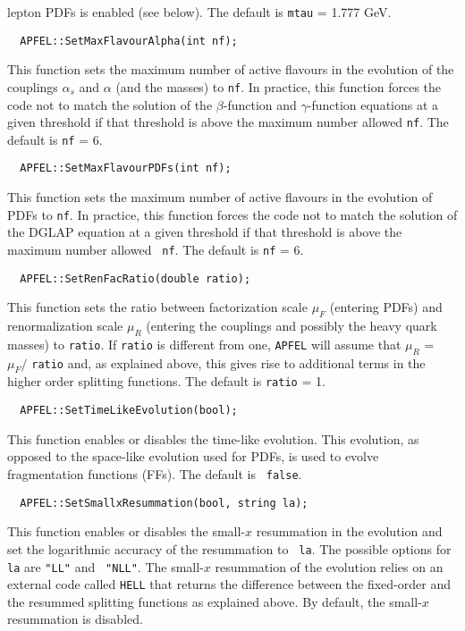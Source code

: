 \documentclass[11pt,a4paper]{article}
\begin{document}
lepton PDFs is enabled (see below). The default is {\tt mtau} =
1.777 GeV.
\begin{lstlisting}
  APFEL::SetMaxFlavourAlpha(int nf);
\end{lstlisting}
This function sets the maximum number of active flavours in the
evolution of the couplings $\alpha_s$ and $\alpha$ (and the masses) to
{\tt nf}. In practice, this function forces the code not to match the
solution of the $\beta$-function and $\gamma$-function equations at a
given threshold if that threshold is above the maximum number allowed
{\tt nf}. The default is {\tt nf} = 6.
\begin{lstlisting}
  APFEL::SetMaxFlavourPDFs(int nf);
\end{lstlisting}
This function sets the maximum number of active flavours in the
evolution of PDFs to {\tt nf}. In practice, this function forces the
code not to match the solution of the DGLAP equation at a given
threshold if that threshold is above the maximum number allowed {\tt
  nf}. The default is {\tt nf} = 6.
\begin{lstlisting}
  APFEL::SetRenFacRatio(double ratio);
\end{lstlisting}
This function sets the ratio between factorization scale $\mu_F$
(entering PDFs) and renormalization scale $\mu_R$ (entering the
couplings and possibly the heavy quark masses) to {\tt ratio}. If
{\tt ratio} is different from one, {\tt APFEL} will assume that
$\mu_R$ = $\mu_F /$ {\tt ratio} and, as explained above, this gives
rise to additional terms in the higher order splitting functions. The
default is {\tt ratio} = 1.
\begin{lstlisting}
  APFEL::SetTimeLikeEvolution(bool);
\end{lstlisting}
This function enables or disables the time-like evolution. This
evolution, as opposed to the space-like evolution used for PDFs, is
used to evolve fragmentation functions (FFs). The default is {\tt
  false}.
\begin{lstlisting}
  APFEL::SetSmallxResummation(bool, string la);
\end{lstlisting}
This function enables or disables the small-$x$ resummation in the
evolution and set the logarithmic accuracy of the resummation to {\tt
  la}. The possible options for {\tt la} are {\tt "LL"} and {\tt
  "NLL"}. The small-$x$ resummation of the evolution relies on an
  external code called {\tt HELL} that returns the difference between
  the fixed-order and the resummed splitting functions as explained
  above. By default, the small-$x$ resummation is disabled.
\end{document}
